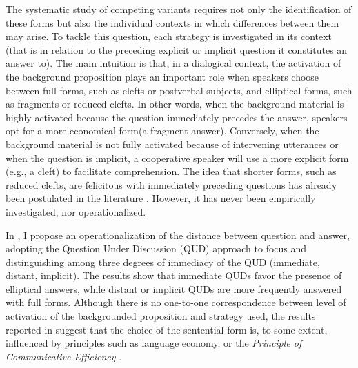 The systematic study of competing variants requires not only the identification of these forms but also the individual contexts in which differences between them may arise. To tackle this question, each strategy is investigated in its context (that is in relation to the preceding explicit or implicit question it constitutes an answer to). The main intuition is that, in a dialogical context, the activation of the background proposition plays an important role when speakers choose between full forms, such as clefts or postverbal subjects, and elliptical forms, such as fragments or reduced clefts. In other words, when the background material is highly activated because the question immediately precedes the answer, speakers opt for a more economical form(a fragment answer). Conversely, when the background material is not fully activated because of intervening utterances or when the question is implicit, a cooperative speaker will use a more explicit form (e.g., a cleft) to facilitate comprehension. The idea that shorter forms, such as reduced clefts, are felicitous with immediately preceding questions has already been postulated in the literature \parencite{belletti2008answering, katz2000categories}. However, it has never been empirically investigated, nor operationalized. 

In \textsc{}, I propose an operationalization of the distance between question and answer, adopting the Question Under Discussion (QUD) approach to focus \parencite{roberts1996information, buring2003d, beaver2009sense, riester2018annotation} and distinguishing among three degrees of immediacy of the QUD (immediate, distant, implicit). The results show that immediate QUDs favor the presence of elliptical answers, while distant or implicit QUDs are more frequently answered with full forms. Although there is no one-to-one correspondence between level of activation of the backgrounded proposition and strategy used, the results reported in \textsc{} suggest that the choice of the sentential form is, to some extent, influenced by principles such as language economy, or the \textit{Principle of Communicative Efficiency} \parencite[30]{Levshina_2022}.

